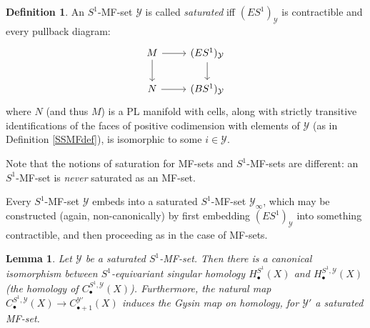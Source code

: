 \documentclass[12pt]{article}
\newtheorem{lemma}[theorem]{Lemma}
\theoremstyle{definition}
\newtheorem{definition}[theorem]{Definition}
\theoremstyle{remark}
\numberwithin{equation}{subsection}
\newcommand{\Y}{\mathcal Y}
\begin{document}
\begin{definition}
An $S^1$-MF-set $\Y$ is called \emph{saturated} iff $(ES^1)_\Y$ is contractible and every pullback diagram:
\begin{equation}
\begin{tikzcd}
M\ar{r}\ar{d}&(ES^1)_\Y\ar{d}\\
N\ar{r}&(BS^1)_\Y
\end{tikzcd}
\end{equation}
where $N$ (and thus $M$) is a PL manifold with cells, along with strictly transitive identifications of the faces of positive codimension with elements of $\Y$ (as in Definition \ref{SSMFdef}), is isomorphic to some $i\in\Y$.

Note that the notions of saturation for MF-sets and $S^1$-MF-sets are different: an $S^1$-MF-set is \emph{never} saturated as an MF-set.
\end{definition}

Every $S^1$-MF-set $\Y$ embeds into a saturated $S^1$-MF-set $\Y_\infty$, which may be constructed (again, non-canonically) by first embedding $(ES^1)_\Y$ into something contractible, and then proceeding as in the case of MF-sets.

\begin{lemma}\label{saturatedcalculatesHSS}
Let $\Y$ be a saturated $S^1$-MF-set.  Then there is a canonical isomorphism between $S^1$-equivariant singular homology $H^{S^1}_\bullet(X)$ and $H^{S^1,\Y}_\bullet(X)$ (the homology of $C^{S^1,\Y}_\bullet(X)$).  Furthermore, the natural map $C_\bullet^{S^1,\Y}(X)\to C_{\bullet+1}^{\Y'}(X)$ induces the Gysin map on homology, for $\Y'$ a saturated MF-set.
\end{lemma}
\end{document}
